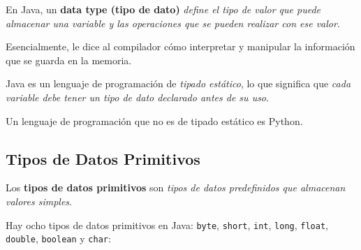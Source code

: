 \documentclass[12pt]{article}
\theoremstyle{largebreak}
\begin{document}
    \begin{mydef}
        En Java, un \textbf{data type (tipo de dato)} \textit{define el tipo de valor que puede almacenar una variable y las operaciones que se pueden realizar con ese valor}.
    \end{mydef}
    
    Esencialmente, le dice al compilador cómo interpretar y manipular la información que se guarda en la memoria.
    
    \begin{obs}
        Java es un lenguaje de programación de \textit{tipado estático}, lo que significa que \textit{cada variable debe tener un tipo de dato declarado antes de su uso}.
        
        Un lenguaje de programación que no es de tipado estático es Python.
    \end{obs}

    \subsection{Tipos de Datos Primitivos}

    \begin{mydef}
        Los \textbf{tipos de datos primitivos} son \textit{tipos de datos predefinidos que almacenan valores simples}.
    \end{mydef}
    
    Hay ocho tipos de datos primitivos en Java: \lstinline|byte|, \lstinline|short|, \lstinline|int|, \lstinline|long|, \lstinline|float|, \lstinline|double|, \lstinline|boolean| y \lstinline|char|:
\end{document}
